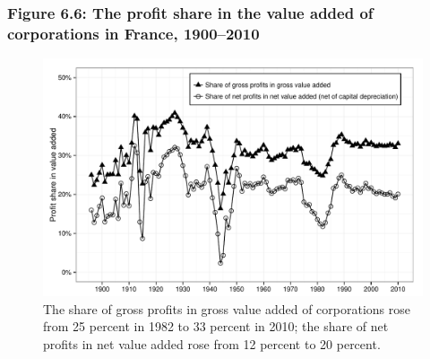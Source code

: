 \documentclass[t]{beamer}\usepackage[]{graphicx}\usepackage[]{color}
\newenvironment{knitrout}{}{} %
\begin{document}
\begin{frame}[label=Figure_6_6]
\frametitle{Figure 6.6: The profit share in the value added of corporations in France, 1900--2010}
\begin{figure}[t]
\begin{minipage}[b]{\textwidth}
\centering
\begin{knitrout}\footnotesize
{}\color{fgcolor}

{\centering \includegraphics[width=1\linewidth]{figures/bw/Figure_6_6} 

}



\end{knitrout}
\caption{The share of gross profits in gross value added of corporations rose from 25 percent in 1982 to 33 percent in 2010; the share of net profits in net value added rose from 12 percent to 20 percent.}
\end{minipage}
\end{figure}
\end{frame}
\end{document}
